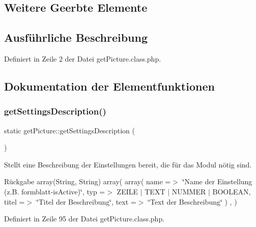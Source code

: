 \subsection*{Weitere Geerbte Elemente}


\subsection{Ausführliche Beschreibung}


Definiert in Zeile 2 der Datei get\+Picture.\+class.\+php.



\subsection{Dokumentation der Elementfunktionen}
\mbox{\label{classget_picture_a5ee51470a762b6e8e3e77a03a372294a}} 
\subsubsection{\texorpdfstring{get\+Settings\+Description()}{getSettingsDescription()}}
{\footnotesize\ttfamily static get\+Picture\+::get\+Settings\+Description (\begin{DoxyParamCaption}{ }\end{DoxyParamCaption})\hspace{0.3cm}{\ttfamily [static]}}

Stellt eine Beschreibung der Einstellungen bereit, die für das Modul nötig sind. \begin{DoxyReturn}{Rückgabe}
array(\+String, String) array( array( \textquotesingle{}name\textquotesingle{} =$>$ \char`\"{}\+Name der Einstellung (z.\+B. formblatt-\/is\+Active)\char`\"{}, \textquotesingle{}typ\textquotesingle{} =$>$ Z\+E\+I\+LE $\vert$ T\+E\+XT $\vert$ N\+U\+M\+M\+ER $\vert$ B\+O\+O\+L\+E\+AN, \textquotesingle{}titel\textquotesingle{} =$>$ \char`\"{}\+Titel der Beschreibung\char`\"{}, \textquotesingle{}text\textquotesingle{} =$>$ \char`\"{}\+Text der Beschreibung\char`\"{} ) , ) 
\end{DoxyReturn}


Definiert in Zeile 95 der Datei get\+Picture.\+class.\+php.

\mbox{\label{classget_picture_a2fe10da0634bf54d950004ab61c8907c}} 
